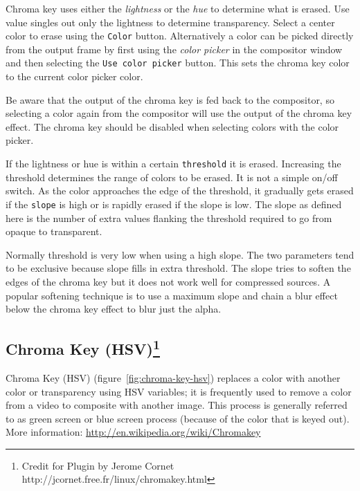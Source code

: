 Chroma key uses either the \textit{lightness} or the \textit{hue} to determine what is erased. Use value singles out only the lightness to determine transparency.
Select a center color to erase using the \texttt{Color} button. Alternatively a color can be picked directly from the output frame by first using the \textit{color picker} in the compositor window and then selecting the \texttt{Use color picker} button. This sets the chroma key color to the current color picker color.

Be aware that the output of the chroma key is fed back to the compositor, so selecting a color again from the compositor will use the output of the chroma key effect. The chroma key should be disabled when selecting colors with the color picker.

If the lightness or hue is within a certain \texttt{threshold} it is erased. Increasing the threshold determines the range of colors to be erased. It is not a simple on/off switch. As the color approaches the edge of the threshold, it gradually gets erased if the \texttt{slope} is high or is rapidly erased if the slope is low. The slope as defined here is the number of extra values flanking the threshold required to go from opaque to transparent.

Normally threshold is very low when using a high slope. The two parameters tend to be exclusive because slope fills in extra threshold. The slope tries to soften the edges of the chroma key but it does not work well for compressed sources. A popular softening technique is to use a maximum slope and chain a blur effect below the chroma key effect to blur just the alpha.

\subsection{Chroma Key (HSV)\protect\footnote{Credit for Plugin by Jerome Cornet http://jcornet.free.fr/linux/chromakey.html}}%
\label{sub:chroma_key_hsv}

Chroma Key (HSV) (figure~\ref{fig:chroma-key-hsv}) replaces a color with another color or transparency using HSV variables; it is frequently used to remove a color from a video to composite with another image. This process is generally referred to as green screen or blue screen process (because of the color that is keyed out). More information: \url{http://en.wikipedia.org/wiki/Chromakey}

